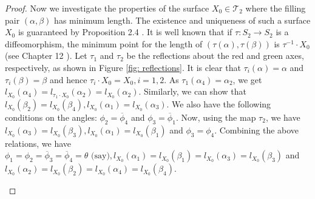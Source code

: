 \documentclass[11pt,reqno]{amsart}
\theoremstyle{plain}
\theoremstyle{definition}
\theoremstyle{remark}
\numberwithin{equation}{section}
\numberwithin{figure}{section}
\begin{document}
\begin{proof}
Now we investigate the properties of the surface $X_0 \in \mathcal{T}_2$ where the filling pair $(\alpha, \beta)$ has minimum length. The existence and uniqueness of such a surface $X_0$ is guaranteed by Proposition 2.4 \cite{Schmutz1993}. It is well known that if $\tau: S_2 \to S_2$ is a diffeomorphism, the minimum point for the length of  $(\tau(\alpha), \tau(\beta))$ is $\tau^{-1}\cdot X_0$ (see Chapter 12 \cite{MR2850125}). Let $\tau_1$ and $\tau_2$ be the reflections about the red and green axes, respectively, as shown in Figure \ref{fig: reflections}. It is clear that $\tau_i(\alpha)= \alpha$ and $\tau_i(\beta)= \beta$ and hence $\tau_i\cdot X_0 =X_0, i=1,2$. As $\tau_1(\alpha_4)= \alpha_2$, we get $l_{X_0}(\alpha_4)= l_{\tau_1 \cdot X_0}(\alpha_2)= l_{X_0}(\alpha_2)$. Similarly, we can show that $l_{X_0}(\beta_2)= l_{X_0}(\beta_4), l_{X_0}(\alpha_1)= l_{X_0}(\alpha_3)$. We also have the following conditions on the angles: $\phi_2= \overline{\phi}_4$ and $\phi_3= \overline{\phi}_1$. Now, using the map $\tau_2$, we have $l_{X_0}(\alpha_3)= l_{X_0}(\beta_3), l_{X_0}(\alpha_1)= l_{X_0}(\beta_1)$ and $\phi_3 = \phi_4$. Combining the above relations, we have $\phi_1= \phi_2= \overline{\phi}_3= \overline{\phi}_4= \theta \text{ (say}), l_{X_0}(\alpha_1)= l_{X_0}(\beta_1) = l_{X_0}(\alpha_3)= l_{X_0}(\beta_3)$ and $ l_{X_0}(\alpha_2)= l_{X_0}(\beta_2)=l_{X_0}(\alpha_4)= l_{X_0}(\beta_4)$.

\begin{figure}[htbp]
    \centering
\end{figure}
\end{proof}
\end{document}
